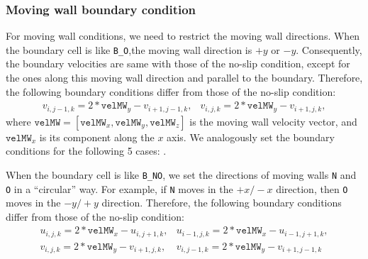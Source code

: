 \documentclass[a4paper, 12pt]{article}
\begin{document}
\subsubsection{Moving wall boundary condition}\label{sec:moving_wall}
For moving wall conditions, we need to restrict the moving wall directions.
When the boundary cell is like \texttt{B\_O},the moving wall direction is $+y$ or $-y$. Consequently, the boundary velocities are same with those of the no-slip condition, except for the ones along this moving wall direction and parallel to the boundary. Therefore, the following boundary conditions differ from those of the no-slip condition:
\begin{equation}
\begin{array}{ll}
v_{i,j-1,k} = 2*\texttt{velMW}_y-v_{i+1,j-1,k}, & v_{i,j,k} = 2*\texttt{velMW}_y-v_{i+1,j,k}, 
\end{array}
\end{equation}
where $\texttt{velMW} = [\texttt{velMW}_x, \texttt{velMW}_y, \texttt{velMW}_z]$ is the moving wall velocity vector, and $\texttt{velMW}_x$ is its component along the $x$ axis. We analogously set the boundary conditions for the following 5 cases: .

When the boundary cell is like \texttt{B\_NO}, we set the directions of moving walls \texttt{N} and \texttt{O} in a ``circular'' way. For example, if \texttt{N} moves in the $+x/-x$ direction, then \texttt{O} moves in the $-y/+y$ direction. Therefore, the following boundary conditions differ from those of the no-slip condition:
\begin{equation}
\begin{array}{ll}
u_{i,j,k} = 2*\texttt{velMW}_x-u_{i,j+1,k}, & u_{i-1,j,k} = 2*\texttt{velMW}_x-u_{i-1,j+1,k}, \\
v_{i,j,k} = 2*\texttt{velMW}_y-v_{i+1,j,k}, & v_{i,j-1,k} = 2*\texttt{velMW}_y-v_{i+1,j-1,k}
\end{array}
\end{equation}
\end{document}
